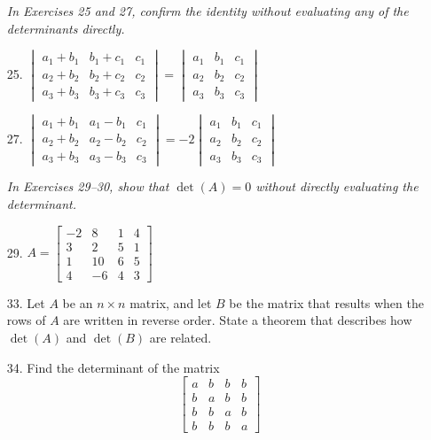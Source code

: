 \documentclass{article}
\theoremstyle{mystyle}
\begin{document}
\begin{enumerate}
\noindent\textit{In Exercises 25 and 27, confirm the identity without evaluating any of the determinants directly.}

\item[25.] $\begin{vmatrix}a_1+b_1&b_1+c_1&c_1\\a_2+b_2&b_2+c_2&c_2\\a_3+b_3&b_3+c_3&c_3\end{vmatrix}=\begin{vmatrix}a_1&b_1&c_1\\a_2&b_2&c_2\\a_3&b_3&c_3\end{vmatrix}$

\item[27.] $\begin{vmatrix}a_1+b_1&a_1-b_1&c_1\\a_2+b_2&a_2-b_2&c_2\\a_3+b_3&a_3-b_3&c_3\end{vmatrix}=-2\begin{vmatrix}a_1&b_1&c_1\\a_2&b_2&c_2\\a_3&b_3&c_3\end{vmatrix}$

\noindent\textit{In Exercises 29--30, show that $\det(A)=0$ without directly evaluating the determinant.}

\item[29.] $A=\begin{bmatrix}-2&8&1&4\\3&2&5&1\\1&10&6&5\\4&-6&4&3\end{bmatrix}$

\item[33.] Let $A$ be an $n\times n$ matrix, and let $B$ be the matrix that results when the rows of $A$ are written in reverse order. State a theorem that describes how $\det(A)$ and $\det(B)$ are related.

\item[34.] Find the determinant of the matrix
\[
\begin{bmatrix}a&b&b&b\\b&a&b&b\\b&b&a&b\\b&b&b&a\end{bmatrix}
\]
\end{enumerate}
\end{document}
